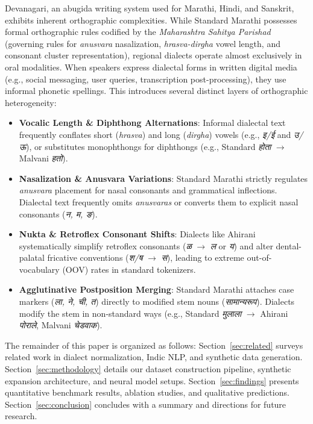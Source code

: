 Devanagari, an abugida writing system used for Marathi, Hindi, and Sanskrit, exhibits inherent orthographic complexities. While Standard Marathi possesses formal orthographic rules codified by the \emph{Maharashtra Sahitya Parishad} (governing rules for \emph{anusvara} nasalization, \emph{hrasva-dirgha} vowel length, and consonant cluster representation), regional dialects operate almost exclusively in oral modalities. When speakers express dialectal forms in written digital media (e.g., social messaging, user queries, transcription post-processing), they use informal phonetic spellings. This introduces several distinct layers of orthographic heterogeneity:

\begin{itemize}
    \item \textbf{Vocalic Length \& Diphthong Alternations}: Informal dialectal text frequently conflates short (\emph{hrasva}) and long (\emph{dirgha}) vowels (e.g., \emph{इ/ई} and \emph{उ/ऊ}), or substitutes monophthongs for diphthongs (e.g., Standard \emph{होता} $\rightarrow$ Malvani \emph{हतो}).
    \item \textbf{Nasalization \& Anusvara Variations}: Standard Marathi strictly regulates \emph{anusvara} placement for nasal consonants and grammatical inflections. Dialectal text frequently omits \emph{anusvaras} or converts them to explicit nasal consonants (\emph{न, म, ङ}).
    \item \textbf{Nukta \& Retroflex Consonant Shifts}: Dialects like Ahirani systematically simplify retroflex consonants (\emph{ळ} $\rightarrow$ \emph{ल} or \emph{य}) and alter dental-palatal fricative conventions (\emph{श/ष} $\rightarrow$ \emph{स}), leading to extreme out-of-vocabulary (OOV) rates in standard tokenizers.
    \item \textbf{Agglutinative Postposition Merging}: Standard Marathi attaches case markers (\emph{ला, ने, ची, त}) directly to modified stem nouns (\emph{सामान्यरूप}). Dialects modify the stem in non-standard ways (e.g., Standard \emph{मुलाला} $\rightarrow$ Ahirani \emph{पोराले}, Malvani \emph{चेडवाक}).
\end{itemize}

The remainder of this paper is organized as follows: Section~\ref{sec:related} surveys related work in dialect normalization, Indic NLP, and synthetic data generation. Section~\ref{sec:methodology} details our dataset construction pipeline, synthetic expansion architecture, and neural model setups. Section~\ref{sec:findings} presents quantitative benchmark results, ablation studies, and qualitative predictions. Section~\ref{sec:conclusion} concludes with a summary and directions for future research.


